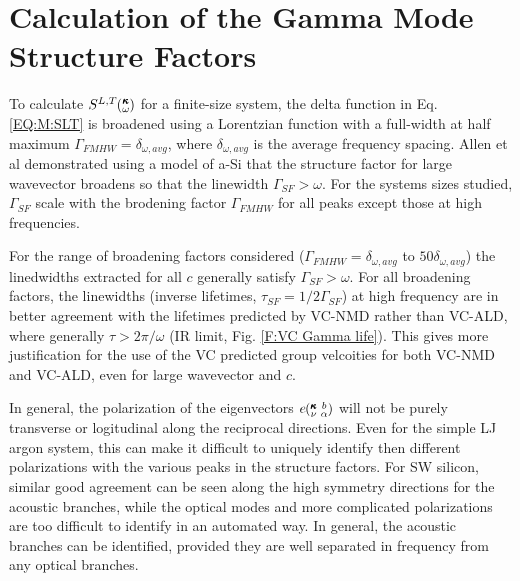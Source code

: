 \documentclass[aps,prb,twocolumn,superscriptaddress,amsmath,amssymb,floatfix]{revtex4}
\newcommand{\kvba}{\mspace{-4.0mu}\left(\mspace{-8.0mu}
\begin{smallmatrix} &\pmb{\kappa} &b \\ &\nu &\alpha\end{smallmatrix}
\mspace{-3.0mu}\right)}
\newcommand{\kw}{\mspace{-4.0mu}\left(\mspace{-8.0mu}
\begin{smallmatrix}&\pmb{\kappa} \\&\omega\end{smallmatrix}
\mspace{-3.0mu}\right)}
\begin{document}
\section{\label{A:SF}Calculation of the Gamma Mode Structure Factors}

To calculate 
$S^{L,T}\kw$ for a finite-size system, the 
delta function in Eq. \eqref{EQ:M:SLT} is broadened using a Lorentzian 
function with a full-width at half maximum 
$\Gamma_{FMHW} = \delta_{\omega,avg}$, 
where 
$\delta_{\omega,avg}$ is the average frequency spacing. 
Allen et al\cite{allen_diffusons_1999} 
demonstrated using a model of 
a-Si that the structure factor 
for large wavevector broadens so that the 
linewidth $\Gamma_{SF} > \omega$.
\cite{taraskin_determination_1999}
For the systems sizes studied, $\Gamma_{SF}$ 
scale with the brodening factor 
$\Gamma_{FMHW}$ for all peaks 
except those at high frequencies. 

For the range of broadening factors 
considered ($\Gamma_{FMHW} = \delta_{\omega,avg}$ to $50\delta_{\omega,avg}$) 
the linedwidths extracted for all $c$ 
generally satisfy $\Gamma_{SF} > \omega$. 
For all broadening factors, the linewidths 
(inverse lifetimes, $\tau_{SF} = 1/2\Gamma_{SF}$) 
at high frequency are in better 
agreement with the lifetimes predicted 
by VC-NMD rather than VC-ALD,
where generally $\tau > 2\pi/\omega$ 
(IR limit, Fig. \ref{F:VC Gamma life}).
\cite{taraskin_determination_1999} This gives more  
justification for the use of the VC predicted group velcoities for 
both VC-NMD and VC-ALD, even for large wavevector and $c$. 

In general, the polarization of the eigenvectors $e\kvba$ will not 
be purely transverse or logitudinal along the reciprocal directions. 
Even for the simple LJ argon system, this can make it difficult to 
uniquely identify then different polarizations with the various 
peaks in the structure factors. For SW silicon, similar good agreement 
can be seen along the high symmetry directions for the acoustic branches, 
while the optical modes 
and more complicated polarizations are too difficult to identify in 
an automated way. 
In general, the acoustic branches can be identified, provided they are 
well separated in frequency from any optical branches.
\cite{feldman_numerical_1999,thomas_predicting_2010} 

\end{document}
